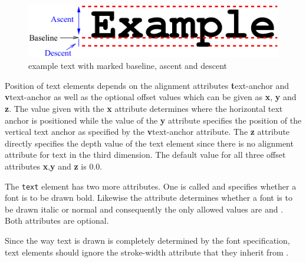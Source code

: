 \begin{figure}[!ht]
\begin{center}
\includegraphics[scale=0.60]{figures/VerticalTextPlacement1}
\end{center}
\caption{example text with marked baseline, ascent and descent}
\label{VerticalTextPlacement1}
\end{figure}


{\color{red} Position of text elements depends on the alignment attributes {\textbf text-anchor} and {\textbf vtext-anchor} as well as the optional offset values which can be given as {\textbf x}, {\textbf y} and {\textbf z}}.
{\color{red} The value given with the {\textbf x} attribute determines where the horizontal text anchor is positioned while the value of the {\textbf y} attribute specifies the position of the vertical text anchor as specified by the {\textbf vtext-anchor} attribute. The {\textbf z} attribute directly specifies the depth value of the text element since there is no alignment attribute for text in the third dimension.}
The default value for all three offset attributes {\textbf x},{\textbf y} and {\textbf z} is $0.0$.

The \texttt{text} element has two more attributes. One is called
 and specifies whether a font is to be drawn bold. 
Likewise the  attribute determines whether a font is to be
drawn italic or normal and consequently the only allowed values are
 and . Both attributes are optional. 

Since the way text is drawn is completely determined by the font specification, text elements should ignore the stroke-width attribute that they inherit from \GraphicalPrimitiveOneD.


